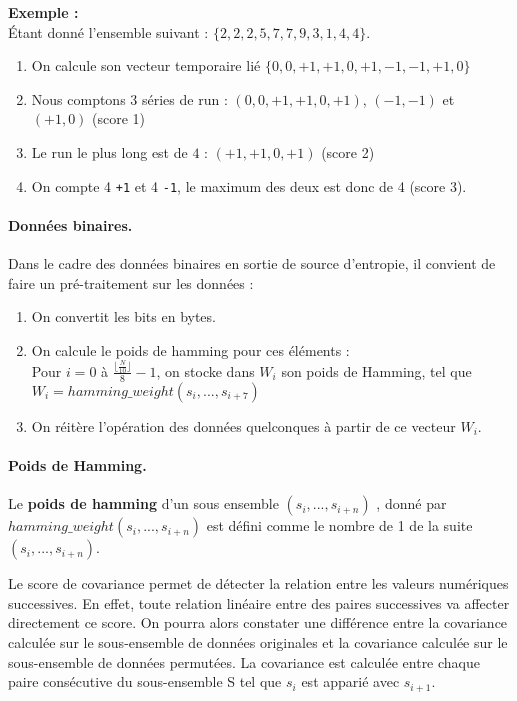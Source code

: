 \textbf{Exemple :} \\
Étant donné l'ensemble suivant : $\lbrace 2, 2, 2, 5, 7, 7, 9, 3, 1, 4, 4 \rbrace$. 
\begin{enumerate}
\item On calcule son vecteur temporaire lié $ \lbrace 0, 0, +1, +1, 0, +1, -1, -1, +1, 0 \rbrace $
\item Nous comptons 3 séries de run : $(0,0,+1,+1,0,+1)$, $(-1,-1)$ et $(+1,0)$ (score 1)
\item Le run le plus long est de $4$ : $(+1,+1,0,+1)$ (score 2)
\item On compte 4 \texttt{+1} et 4 \texttt{-1}, le maximum des deux est donc de 4 (score 3).
\end{enumerate}


\paragraph{Données binaires.\\}
Dans le cadre des données binaires en sortie de source d'entropie, il convient de faire un pré-traitement sur les données : 
\begin{enumerate}
\item On convertit les bits en bytes.
\item On calcule le poids de hamming pour ces éléments : \\
Pour $i=0$ à $\frac{\lfloor\frac{N}{10}\rfloor}{8} -1 $, on stocke dans $W_i$ son poids de Hamming, tel que $W_i=hamming\_weight(s_i,...,s_{i+7})$
\item On réitère l'opération des données quelconques à partir de ce vecteur $W_i$.
\end{enumerate}

\paragraph{Poids de Hamming.\\}
Le \textbf{poids de hamming} d'un sous ensemble $(s_i,...,s_{i+n})$ , donné par $hamming\_weight(s_i,...,s_{i+n})$ est défini comme le nombre de 1 de la suite $(s_i,...,s_{i+n})$.



Le score de covariance permet de détecter la relation entre les valeurs numériques successives. En effet, toute relation linéaire entre des paires successives va affecter directement ce score. On pourra alors constater une différence entre la covariance calculée sur le sous-ensemble de données originales et la covariance calculée sur le sous-ensemble de données permutées. La covariance est calculée entre chaque paire consécutive du sous-ensemble S tel que $s_i$ est apparié avec $s_{i+1}$.\\

